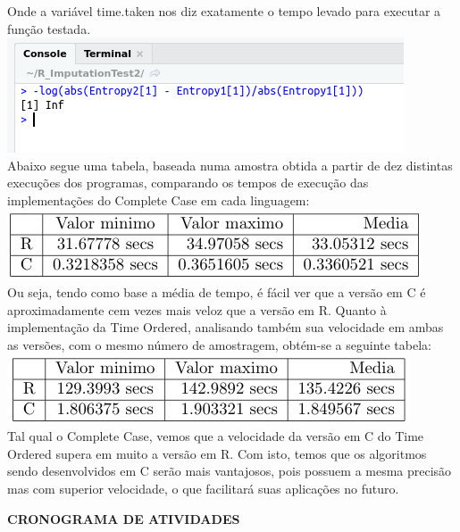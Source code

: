 \documentclass{article}
\begin{document}
Onde a variável time.taken nos diz exatamente o tempo levado para executar a função testada.\\

\includegraphics[width=0.80\columnwidth]{Code.png}\\

Abaixo segue uma tabela, baseada numa amostra obtida a partir de dez distintas execuções dos programas, comparando os tempos de execução das implementações do Complete Case em cada linguagem:\\

\includegraphics[width=0.80\columnwidth]{RxCtable1.png}\\

Ou seja, tendo como base a média de tempo, é fácil ver que a versão em C é aproximadamente cem vezes mais veloz que a versão em R.
Quanto à implementação da Time Ordered, analisando também sua velocidade em ambas as versões, com o mesmo número de amostragem, obtém-se a seguinte tabela:\\

\includegraphics[width=0.80\columnwidth]{RxCtable2.png}\\

Tal qual o Complete Case, vemos que a velocidade da versão em C do Time Ordered supera em muito a versão em R.
Com isto, temos que os algoritmos sendo desenvolvidos em C serão mais vantajosos, pois possuem a mesma precisão mas com superior velocidade, o que facilitará suas aplicações no futuro.\\

\newpage
\begin{center}
\textbf{\large{CRONOGRAMA DE ATIVIDADES}}\\
\hrulefill \\
\end{center}
\end{document}
